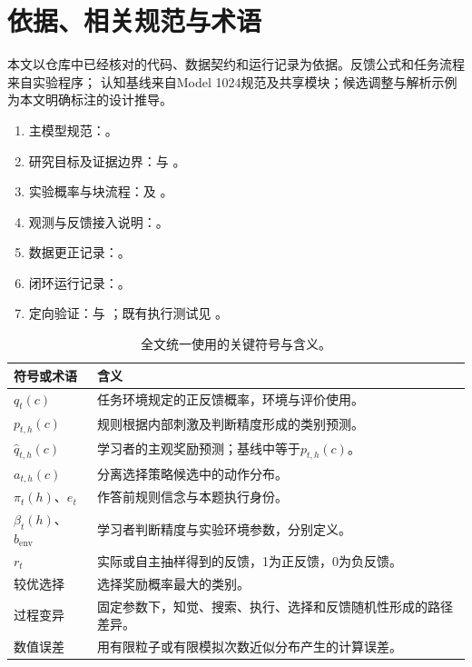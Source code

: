 \documentclass[11pt,a4paper]{article}
\numberwithin{equation}{section}
\begin{document}
\section{依据、相关规范与术语}
\label{app:sources}
本文以仓库中已经核对的代码、数据契约和运行记录为依据。反馈公式和任务流程来自实验程序；
认知基线来自Model 1024规范及共享模块；候选调整与解析示例为本文明确标注的设计推导。

\begin{enumerate}
\item 主模型规范：。
\item 研究目标及证据边界：与
。
\item 实验概率与块流程：及
。
\item 观测与反馈接入说明：。
\item 数据更正记录：。
\item 闭环运行记录：。
\item 定向验证：与
；既有执行测试见
。
\end{enumerate}

\begin{table}[htbp]
\centering\small
\caption{全文统一使用的关键符号与含义。}
\begin{tabularx}{\linewidth}{L{3.2cm}Y}
\toprule 符号或术语 & 含义\\\midrule
$q_t(c)$ & 任务环境规定的正反馈概率，环境与评价使用。\\
$p_{t,h}(c)$ & 规则根据内部刺激及判断精度形成的类别预测。\\
$\widehat q_{t,h}(c)$ & 学习者的主观奖励预测；基线中等于$p_{t,h}(c)$。\\
$a_{t,h}(c)$ & 分离选择策略候选中的动作分布。\\
$\pi_t(h)$、$e_t$ & 作答前规则信念与本题执行身份。\\
$\beta_t(h)$、$b_{\mathrm{env}}$ & 学习者判断精度与实验环境参数，分别定义。\\
$r_t$ & 实际或自主抽样得到的反馈，1为正反馈，0为负反馈。\\
较优选择 & 选择奖励概率最大的类别。\\
过程变异 & 固定参数下，知觉、搜索、执行、选择和反馈随机性形成的路径差异。\\
数值误差 & 用有限粒子或有限模拟次数近似分布产生的计算误差。\\
\bottomrule
\end{tabularx}
\end{table}
\end{document}
